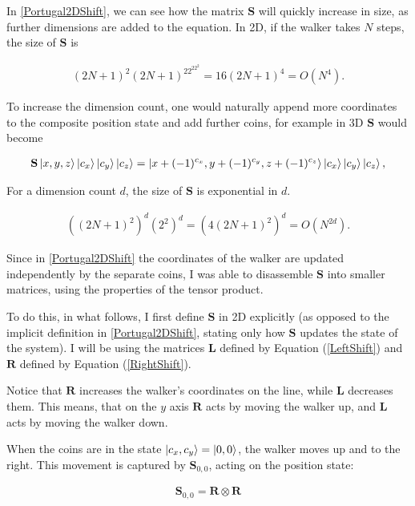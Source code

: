 
In \ref{Portugal2DShift}, we can see how the matrix $\mathbf{S}$ will quickly increase in size, as further dimensions are
added to the equation. In 2D, if the walker takes $N$ steps, the size of $\mathbf{S}$ is

\begin{align*}
(2N+1)^2(2N+1)^22^22^2 = 16(2N+1)^4 = O(N^4).
\end{align*}

To increase the dimension count, one would naturally append more coordinates to the composite position state and add further coins, for example in 3D $\mathbf{S}$ would become

\begin{align*}
    \mathbf{S}\ket{x,y,z}\ket{c_x}\ket{c_y}\ket{c_z} =
    \ket{x + (-1)^{c_x}, y + (-1)^{c_y}, z + (-1)^{c_z}}\ket{c_x}\ket{c_y}\ket{c_z},
\end{align*}

For a dimension count $d$, the size of $\mathbf{S}$ is exponential in $d$.

\begin{align*}
((2N+1)^2)^d(2^2)^d = (4(2N+1)^2)^d = O(N^{2d}).
\end{align*}


Since in \ref{Portugal2DShift} the coordinates of the walker are updated independently by the separate coins, I was able to disassemble $\mathbf{S}$ into smaller matrices, using the properties of the tensor product.

To do this, in what follows, I first define $\mathbf{S}$ in 2D explicitly (as opposed to the implicit definition in \ref{Portugal2DShift}, stating only how $\mathbf{S}$ updates the state of the system). I will be using the matrices $\mathbf{L}$ defined by Equation (\ref{LeftShift}) and $\mathbf{R}$ defined by Equation (\ref{RightShift}).

Notice that $\mathbf{R}$ increases the walker's coordinates on the line, while $\mathbf{L}$ decreases them. This means, that on the $y$ axis $\mathbf{R}$ acts by moving the walker up, and $\mathbf{L}$ acts by moving the walker down.

When the coins are in the state $\ket{c_x,c_y} = \ket{0,0}$, the walker moves up and to the right. This movement is captured by $\mathbf{S}_{0,0}$, acting on the position state:

\begin{align*}
    \mathbf{S}_{0,0} =  \mathbf{R} \otimes \mathbf{R}
\end{align*}

